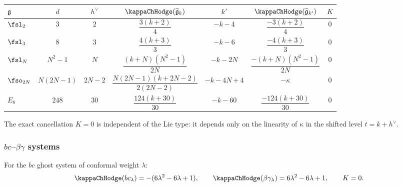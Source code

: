 \begin{computation}
\renewcommand{\arraystretch}{1.4}
\begin{center}
\begin{tabular}{lcccccc}
\toprule
$\mathfrak{g}$ & $d$ & $h^\vee$ & $\kappaChHodge(\widehat{\fg}_k)$ & $k'$ &
$\kappaChHodge(\widehat{\fg}_{k'})$ & $K$ \\
\midrule
$\fsl_2$ & $3$ & $2$ & $\dfrac{3(k+2)}{4}$ & $-k-4$ &
$\dfrac{-3(k+2)}{4}$ & $0$ \\[6pt]
$\fsl_3$ & $8$ & $3$ & $\dfrac{4(k+3)}{3}$ & $-k-6$ &
$\dfrac{-4(k+3)}{3}$ & $0$ \\[6pt]
$\fsl_N$ & $N^2{-}1$ & $N$ & $\dfrac{(k{+}N)(N^2{-}1)}{2N}$ & $-k-2N$ &
$\dfrac{-(k{+}N)(N^2{-}1)}{2N}$ & $0$ \\[6pt]
$\fso_{2N}$ & $N(2N{-}1)$ & $2N{-}2$ & $\dfrac{N(2N{-}1)(k{+}2N{-}2)}{2(2N{-}2)}$ & $-k-4N+4$ &
$-\kappa$ & $0$ \\[6pt]
$E_8$ & $248$ & $30$ & $\dfrac{124(k+30)}{30}$ & $-k-60$ &
$\dfrac{-124(k+30)}{30}$ & $0$ \\
\bottomrule
\end{tabular}
\end{center}
The exact cancellation $K = 0$ is independent of the Lie type: it depends
only on the linearity of $\kappa$ in the shifted level $t = k + h^\vee$.
\end{computation}

\subsubsection{\texorpdfstring{$bc$--$\beta\gamma$}{bc-betagamma} systems}

\begin{proposition}
\label{prop:thqg-IV-bc-bg-K}
For the $bc$ ghost system of conformal weight $\lambda$:
\begin{equation}%
\kappaChHodge(bc_\lambda) = -(6\lambda^2 - 6\lambda + 1),
\qquad
\kappaChHodge(\beta\gamma_\lambda) = 6\lambda^2 - 6\lambda + 1,
\qquad
K = 0.
\end{equation}
\end{proposition}

